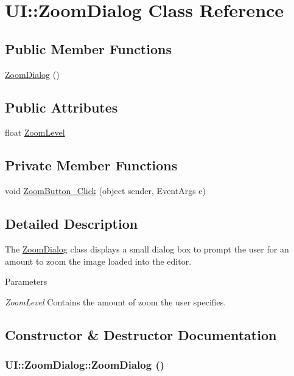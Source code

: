 \hypertarget{class_u_i_1_1_zoom_dialog}{
\section{UI::ZoomDialog Class Reference}
\label{class_u_i_1_1_zoom_dialog}
}
\subsection*{Public Member Functions}
\begin{DoxyCompactItemize}
\item 
\hyperlink{class_u_i_1_1_zoom_dialog_a02490f1600aa052cfe27aa00a7a34635}{ZoomDialog} ()
\end{DoxyCompactItemize}
\subsection*{Public Attributes}
\begin{DoxyCompactItemize}
\item 
float \hyperlink{class_u_i_1_1_zoom_dialog_a99f9c71d0231478132d8f0c4c708d4b1}{ZoomLevel}
\end{DoxyCompactItemize}
\subsection*{Private Member Functions}
\begin{DoxyCompactItemize}
\item 
void \hyperlink{class_u_i_1_1_zoom_dialog_a37e75e75f95e892bfcaa225107d5f0f7}{ZoomButton\_\-Click} (object sender, EventArgs e)
\end{DoxyCompactItemize}


\subsection{Detailed Description}
The \hyperlink{class_u_i_1_1_zoom_dialog}{ZoomDialog} class displays a small dialog box to prompt the user for an amount to zoom the image loaded into the editor.


\begin{DoxyParams}{Parameters}
\item[{\em ZoomLevel}]Contains the amount of zoom the user specifies. \end{DoxyParams}


\subsection{Constructor \& Destructor Documentation}
\hypertarget{class_u_i_1_1_zoom_dialog_a02490f1600aa052cfe27aa00a7a34635}{
\subsubsection[{ZoomDialog}]{\setlength{\rightskip}{0pt plus 5cm}UI::ZoomDialog::ZoomDialog ()}}
\label{class_u_i_1_1_zoom_dialog_a02490f1600aa052cfe27aa00a7a34635}


